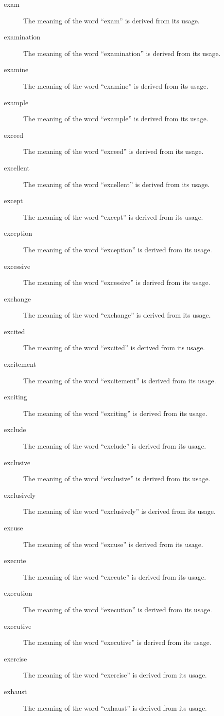\documentclass[12pt, letterpaper]{memoir}
\begin{document}
\begin{description}
\item[exam] The meaning of the word ``exam'' is derived from its usage.
\item[examination] The meaning of the word ``examination'' is derived from its usage.
\item[examine] The meaning of the word ``examine'' is derived from its usage.
\item[example] The meaning of the word ``example'' is derived from its usage.
\item[exceed] The meaning of the word ``exceed'' is derived from its usage.
\item[excellent] The meaning of the word ``excellent'' is derived from its usage.
\item[except] The meaning of the word ``except'' is derived from its usage.
\item[exception] The meaning of the word ``exception'' is derived from its usage.
\item[excessive] The meaning of the word ``excessive'' is derived from its usage.
\item[exchange] The meaning of the word ``exchange'' is derived from its usage.
\item[excited] The meaning of the word ``excited'' is derived from its usage.
\item[excitement] The meaning of the word ``excitement'' is derived from its usage.
\item[exciting] The meaning of the word ``exciting'' is derived from its usage.
\item[exclude] The meaning of the word ``exclude'' is derived from its usage.
\item[exclusive] The meaning of the word ``exclusive'' is derived from its usage.
\item[exclusively] The meaning of the word ``exclusively'' is derived from its usage.
\item[excuse] The meaning of the word ``excuse'' is derived from its usage.
\item[execute] The meaning of the word ``execute'' is derived from its usage.
\item[execution] The meaning of the word ``execution'' is derived from its usage.
\item[executive] The meaning of the word ``executive'' is derived from its usage.
\item[exercise] The meaning of the word ``exercise'' is derived from its usage.
\item[exhaust] The meaning of the word ``exhaust'' is derived from its usage.

\end{description}
\end{document}
